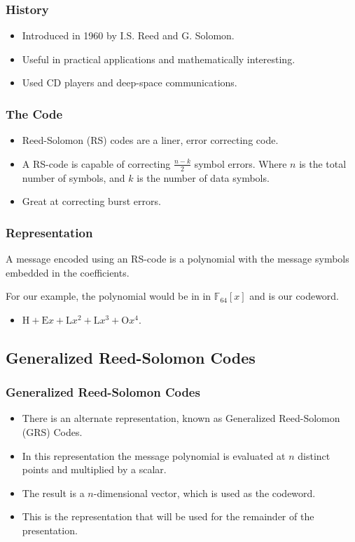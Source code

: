 \documentclass{beamer}
\begin{document}
\begin{frame}
	\frametitle{History}
	\begin{itemize}
		\item Introduced in 1960 by I.S. Reed and G. Solomon.
		\item Useful in practical applications and mathematically interesting.
		\item Used CD players and deep-space communications.
	\end{itemize}
\end{frame}

\begin{frame}
	\frametitle{The Code}
	\begin{itemize}
		\item Reed-Solomon (RS) codes are a liner, error correcting code.
		\item A RS-code is capable of correcting $\frac{n - k}{2}$ symbol errors. Where $n$ is the total number of symbols, and $k$ is the number of data symbols.
		\item Great at correcting burst errors.
	\end{itemize}
\end{frame}

\begin{frame}
	\frametitle{Representation}
	A message encoded using an RS-code is a polynomial with the message symbols embedded in the coefficients.
	
	For our example, the polynomial would be in in $\mathbb{F}_{64}[x]$ and is our codeword.
	\begin{itemize}
		\item $\text{H} + \text{E}x + \text{L}x^{2} + \text{L}x^{3} + \text{O}x^{4}$.
	\end{itemize}	
	

\end{frame}

\subsection{Generalized Reed-Solomon Codes}

\begin{frame}
	\frametitle{Generalized Reed-Solomon Codes}
	\begin{itemize}
		\item There is an alternate representation, known as Generalized Reed-Solomon (GRS) Codes.
		\item In this representation the message polynomial is evaluated at $n$ distinct points and multiplied by a scalar. 
		\item The result is a $n$-dimensional vector, which is used as the codeword.
		\item This is the representation that will be used for the remainder of the presentation.
	\end{itemize}
	
\end{frame}
\end{document}
